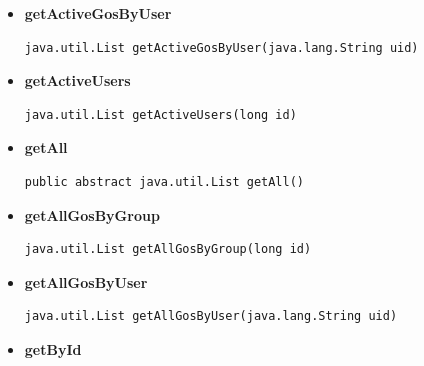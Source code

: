 \documentclass[11pt,a4paper]{report}
\begin{document}
{{{{{{{{{{{{{{{\begin{itemize}
{\begin{lstlisting}[frame=none]
java.util.List getActiveGosByGroup(long id)\end{lstlisting} %
}%
\item{ 
\hypertarget{edu.kit.pse17.go_app.PersistenceLayer.daos.GroupDaoImp.getActiveGosByUser(java.lang.String)}{{\bf  getActiveGosByUser}\\}
\begin{lstlisting}[frame=none]
java.util.List getActiveGosByUser(java.lang.String uid)\end{lstlisting} %
}%
\item{ 
\hypertarget{edu.kit.pse17.go_app.PersistenceLayer.daos.GroupDaoImp.getActiveUsers(long)}{{\bf  getActiveUsers}\\}
\begin{lstlisting}[frame=none]
java.util.List getActiveUsers(long id)\end{lstlisting} %
}%
\item{ 
\hypertarget{edu.kit.pse17.go_app.PersistenceLayer.daos.GroupDaoImp.getAll()}{{\bf  getAll}\\}
\begin{lstlisting}[frame=none]
public abstract java.util.List getAll()\end{lstlisting} %
}%
\item{ 
\hypertarget{edu.kit.pse17.go_app.PersistenceLayer.daos.GroupDaoImp.getAllGosByGroup(long)}{{\bf  getAllGosByGroup}\\}
\begin{lstlisting}[frame=none]
java.util.List getAllGosByGroup(long id)\end{lstlisting} %
}%
\item{ 
\hypertarget{edu.kit.pse17.go_app.PersistenceLayer.daos.GroupDaoImp.getAllGosByUser(java.lang.String)}{{\bf  getAllGosByUser}\\}
\begin{lstlisting}[frame=none]
java.util.List getAllGosByUser(java.lang.String uid)\end{lstlisting} %
}%
\item{ 
\hypertarget{edu.kit.pse17.go_app.PersistenceLayer.daos.GroupDaoImp.getById(java.lang.Long)}{{\bf  getById}\\}
\begin{lstlisting}[frame=none]

\end{lstlisting}}
\end{itemize}}}}}}}}}}}}}}}}
\end{document}
